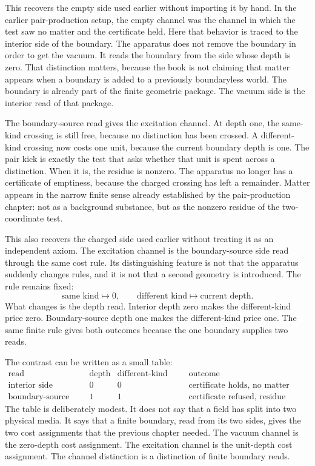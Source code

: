 This recovers the empty side used earlier without importing it by hand. In the earlier
pair-production setup, the empty channel was the channel in which the test saw no
matter and the certificate held. Here that behavior is traced to the interior side of
the boundary. The apparatus does not remove the boundary in order to get the vacuum.
It reads the boundary from the side whose depth is zero. That distinction matters,
because the book is not claiming that matter appears when a boundary is added to a
previously boundaryless world. The boundary is already part of the finite geometric
package. The vacuum side is the interior read of that package.

The boundary-source read gives the excitation channel. At depth one, the same-kind
crossing is still free, because no distinction has been crossed. A different-kind
crossing now costs one unit, because the current boundary depth is one. The pair kick
is exactly the test that asks whether that unit is spent across a distinction. When it
is, the residue is nonzero. The apparatus no longer has a certificate of emptiness,
because the charged crossing has left a remainder. Matter appears in the narrow finite
sense already established by the pair-production chapter: not as a background
substance, but as the nonzero residue of the two-coordinate test.

This also recovers the charged side used earlier without treating it as an independent
axiom. The excitation channel is the boundary-source side read through the same cost
rule. Its distinguishing feature is not that the apparatus suddenly changes rules,
and it is not that a second geometry is introduced. The rule remains fixed:
\[
  \text{same kind} \mapsto 0,
  \qquad
  \text{different kind} \mapsto \text{current depth}.
\]
What changes is the depth read. Interior depth zero makes the different-kind price
zero. Boundary-source depth one makes the different-kind price one. The same finite
rule gives both outcomes because the one boundary supplies two reads.

The contrast can be written as a small table:
\[
\begin{array}{c|c|c|c}
\text{read} & \text{depth} & \text{different-kind cost} & \text{outcome} \\
\hline
\text{interior side} & 0 & 0 & \text{certificate holds, no matter} \\
\text{boundary-source side} & 1 & 1 & \text{certificate refused, residue present}
\end{array}
\]
The table is deliberately modest. It does not say that a field has split into two
physical media. It says that a finite boundary, read from its two sides, gives
the two cost assignments that the previous chapter needed. The vacuum
channel is the zero-depth cost assignment. The excitation channel is the unit-depth
cost assignment. The channel distinction is a distinction of finite boundary reads.

